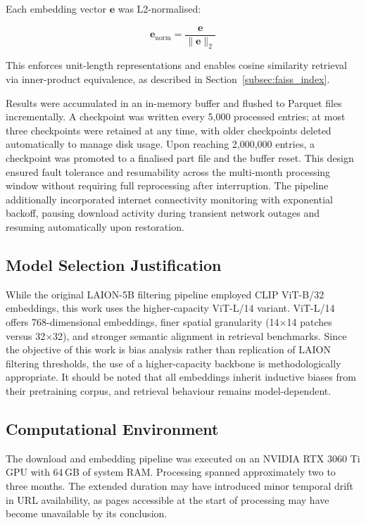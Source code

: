 Each embedding vector $\mathbf{e}$ was L2-normalised:

\[
\mathbf{e}_{\mathrm{norm}} = \frac{\mathbf{e}}{\|\mathbf{e}\|_2}
\]

This enforces unit-length representations and enables cosine similarity
retrieval via inner-product equivalence, as described in
Section~\ref{subsec:faiss_index}.

Results were accumulated in an in-memory buffer and flushed to Parquet
files incrementally. A checkpoint was written every 5,000 processed
entries; at most three checkpoints were retained at any time, with older
checkpoints deleted automatically to manage disk usage. Upon reaching
2,000,000 entries, a checkpoint was promoted to a finalised part file and
the buffer reset. This design ensured fault tolerance and resumability
across the multi-month processing window without requiring full reprocessing
after interruption. The pipeline additionally incorporated internet
connectivity monitoring with exponential backoff, pausing download activity
during transient network outages and resuming automatically upon
restoration.

\subsection{Model Selection Justification}

While the original LAION-5B filtering pipeline employed CLIP ViT-B/32
embeddings, this work uses the higher-capacity ViT-L/14 variant. ViT-L/14
offers 768-dimensional embeddings, finer spatial granularity (14$\times$14
patches versus 32$\times$32), and stronger semantic alignment in retrieval
benchmarks. Since the objective of this work is bias analysis rather than
replication of LAION filtering thresholds, the use of a higher-capacity
backbone is methodologically appropriate. It should be noted that all
embeddings inherit inductive biases from their pretraining corpus, and
retrieval behaviour remains model-dependent.

\subsection{Computational Environment}

The download and embedding pipeline was executed on an NVIDIA RTX 3060 Ti
GPU with 64\,GB of system RAM. Processing spanned approximately two to
three months. The extended duration may have introduced minor temporal drift
in URL availability, as pages accessible at the start of processing may
have become unavailable by its conclusion.

